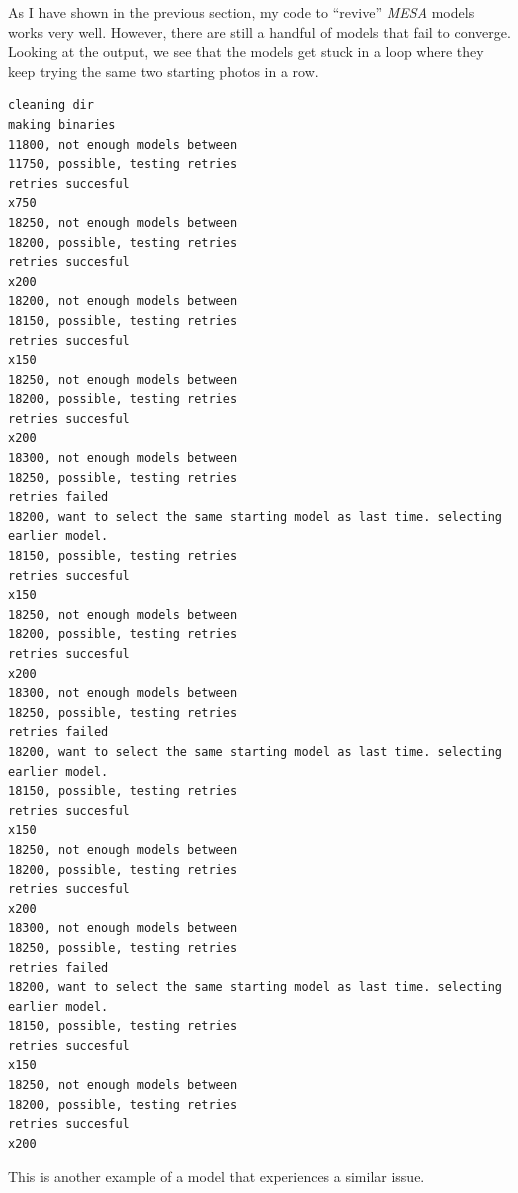\documentclass[a4paper,10pt]{article}
\begin{document}
As I have shown in the previous section, my code to ``revive'' \emph{MESA} models works very well.
However, there are still a handful of models that fail to converge. Looking at the output, we see that the models get stuck in a loop where they keep trying the same two starting photos in a row.

\begin{verbatim}
cleaning dir
making binaries
11800, not enough models between
11750, possible, testing retries
retries succesful
x750
18250, not enough models between
18200, possible, testing retries
retries succesful
x200
18200, not enough models between
18150, possible, testing retries
retries succesful
x150
18250, not enough models between
18200, possible, testing retries
retries succesful
x200
18300, not enough models between
18250, possible, testing retries
retries failed
18200, want to select the same starting model as last time. selecting earlier model.
18150, possible, testing retries
retries succesful
x150
18250, not enough models between
18200, possible, testing retries
retries succesful
x200
18300, not enough models between
18250, possible, testing retries
retries failed
18200, want to select the same starting model as last time. selecting earlier model.
18150, possible, testing retries
retries succesful
x150
18250, not enough models between
18200, possible, testing retries
retries succesful
x200
18300, not enough models between
18250, possible, testing retries
retries failed
18200, want to select the same starting model as last time. selecting earlier model.
18150, possible, testing retries
retries succesful
x150
18250, not enough models between
18200, possible, testing retries
retries succesful
x200
\end{verbatim}

This is another example of a model that experiences a similar issue.
\end{document}
